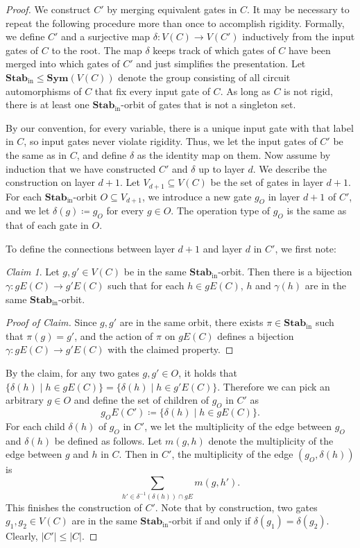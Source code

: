 \documentclass[11pt]{article}
\newcommand{\Sym}{\mathbf{Sym}}
\newcommand{\Stab}{\mathbf{Stab}}
\theoremstyle{definition}
\theoremstyle{plain}
\theoremstyle{remark}
\newtheorem{claim}{Claim}[lemma]
\newenvironment{claimproof}[1][Proof of Claim]{\begin{proof}[#1] \renewcommand{\qedsymbol}{$\lrcorner$}}{ \end{proof}}
\theoremstyle{remark}
\begin{document}
\begin{proof}
	We construct $C'$ by merging equivalent gates in $C$. It may be necessary to repeat the following procedure more than once to accomplish rigidity. 
	Formally, we define $C'$ and a surjective map $\delta \colon V(C) \to V(C')$ inductively from the input gates of $C$ to the root. The map $\delta$ keeps track of which gates of $C$ have been merged into which gates of $C'$ and just simplifies the presentation. 
	Let $\Stab_{\text{in}} \leq \Sym(V(C))$ denote the group consisting of all circuit automorphisms of $C$ that fix every input gate of $C$.	
	As long as $C$ is not rigid, there is at least one $\Stab_{\text{in}}$-orbit of gates that is not a singleton set.
	
	By our convention, for every variable, there is a unique input gate with that label in $C$, so input gates never violate rigidity.
	Thus, we let the input gates of $C'$ be the same as in $C$, and define $\delta$ as the identity map on them. 
	Now assume by induction that we have constructed $C'$ and $\delta$ up to layer $d$. We describe the construction on layer $d+1$. Let $V_{d+1} \subseteq V(C)$ be the set of gates in layer $d+1$. For each $\Stab_{\text{in}}$-orbit $O \subseteq V_{d+1}$, we introduce a new gate $g_O$ in layer $d+1$ of $C'$, and we let $\delta(g) \coloneqq g_O$ for every $g \in O$. The operation type of $g_O$ is the same as that of each gate in $O$.
	
	To define the connections between layer $d+1$ and layer $d$ in $C'$,   
	we first note:
	\begin{claim}
		Let $g,g' \in V(C)$ be in the same $\Stab_{\text{in}}$-orbit. Then there is a bijection $\gamma \colon gE(C) \to g'E(C)$ such that for each $h \in gE(C)$, $h$ and $\gamma(h)$ are in the same $\Stab_{\text{in}}$-orbit.
	\end{claim}
	\begin{claimproof}
		Since $g,g'$ are in the same orbit, there exists $\pi \in \Stab_{\text{in}}$ such that $\pi(g) = g'$, and the action of $\pi$ on $gE(C)$ defines a bijection $\gamma \colon gE(C) \to g'E(C)$ with the claimed property.
	\end{claimproof}
	By the claim, for any two gates $g,g' \in O$, it holds that $\{ \delta(h) \mid h \in gE(C) \} = \{ \delta(h) \mid h \in g'E(C)  \}$. Therefore we can pick an arbitrary $g \in O$ and define the set of children of $g_O$ in $C'$ as 
	\[
	g_OE(C') \coloneqq \{ \delta(h) \mid h \in gE(C) \}.
	\]
	For each child $\delta(h)$ of $g_O$ in $C'$, we let the multiplicity of the edge
	between $g_O$ and $\delta(h)$ be defined as follows. Let $m(g,h)$ denote the multiplicity of the edge between $g$ and $h$ in $C$.
	Then in $C'$, the multiplicity of the edge $(g_O, \delta(h))$ is
	\[
	\sum_{h' \in \delta^{-1}(\delta(h)) \cap gE} m(g,h').
	\]
	This finishes the construction of $C'$. Note that by construction, two gates $g_1,g_2 \in V(C)$ are in the same $\Stab_{\text{in}}$-orbit if and only if $\delta(g_1) = \delta(g_2)$. Clearly, $|C'| \leq |C|$. 
	

\end{proof}
\end{document}
